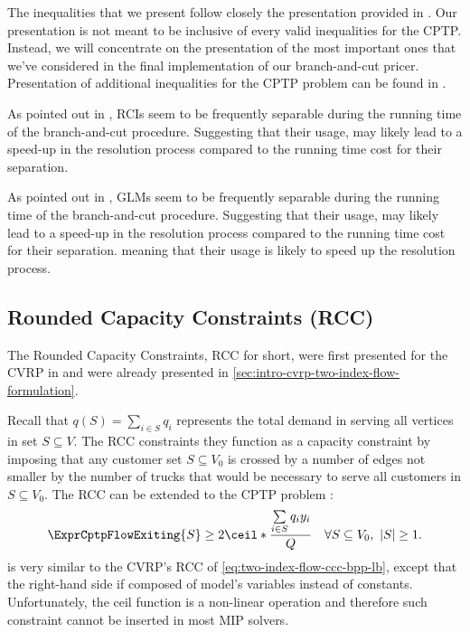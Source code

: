 The inequalities that we present follow closely the presentation provided in \textcite{jepsen2014}.
Our presentation is not meant to be inclusive of every valid inequalities for the CPTP.
Instead, we will concentrate on the presentation of the most important ones
that we've considered in the final implementation of our branch-and-cut pricer.
Presentation of additional inequalities for the CPTP problem can be found in \textcite{jepsen2014}.

As pointed out in \textcite{jepsen2014},
RCIs seem to be frequently separable during the running time of the branch-and-cut procedure.
Suggesting that their usage, may likely lead to a speed-up in the resolution process
compared to the running time cost for their separation.

As pointed out in \textcite{jepsen2014},
GLMs seem to be frequently separable during the running time of the branch-and-cut procedure.
Suggesting that their usage, may likely lead to a speed-up in the resolution process
compared to the running time cost for their separation.
meaning that their usage is likely to speed up the resolution process.

\subsection{Rounded Capacity Constraints (RCC)}
\label{sec:cptp-rcc}

The Rounded Capacity Constraints, RCC for short, were first presented
for the CVRP  in \textcite{laporte1983}
and were already presented in \cref{sec:intro-cvrp-two-index-flow-formulation}.

Recall that $q(S) = \sum_{i \in S} q_i$ represents
the total demand in serving all vertices in set $S \subseteq V$.
The RCC constraints they function as a capacity constraint
by imposing that any customer set $S \subseteq V_0$ is crossed by a number of edges
not smaller by the number of trucks that would be necessary to serve all customers in $S \subseteq V_0$.
The RCC can be extended to the CPTP problem \parencite{jepsen2014}:
\begin{equation}
	\label{eq:cptp-rcc-inequality-original}
	\ExprCptpFlowExiting{S} \ge 2 \ceil*{\frac{\sum\limits_{i \in S} q_i y_i}{Q}} \quad \forall S \subseteq V_0,\ |S| \ge 1.
\end{equation}
is very similar to the CVRP's RCC of \cref{eq:two-index-flow-ccc-bpp-lb},
except that the right-hand side if composed of model's variables instead of constants.
Unfortunately, the ceil function is a non-linear operation and therefore
such constraint cannot be inserted in most MIP solvers.

